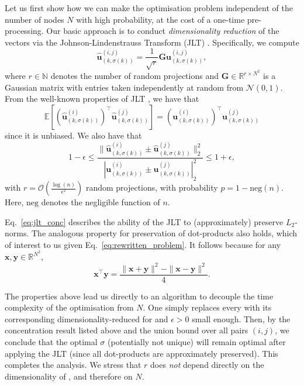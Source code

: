 Let us first show how we can make the optimisation problem independent of the number of nodes $N$ with high probability, at the cost of \vspace{0.25mm}a one-time pre-processing.
Our basic approach is to conduct \emph{dimensionality reduction} of the vectors  via the Johnson-Lindenstrauss Transform (JLT) \citep{jlt}.
Specifically, we compute
\begin{equation}
\widehat{\mathbf{u}}^{(i,j)}_{(k,\sigma(k))} = \frac{1}{\sqrt{r}}\mathbf{G}\mathbf{u}^{(i,j)}_{(k,\sigma(k))},  
\end{equation}
where $r \in \mathbb{N}$ denotes the number of random projections and 
$\mathbf{G} \in \mathbb{R}^{r \times N^{2}}$ is a Gaussian matrix with entries taken independently at random from $\mathcal{N}(0, 1)$.
From the well-known properties of JLT \citep{dasgupta_jlt}, we have that
\begin{equation}
\mathbb{E}[(\widehat{\mathbf{u}}^{(i)}_{(k,\sigma(k))})^{\top}\widehat{\mathbf{u}}^{(j)}_{(k,\sigma(k))}] = 
(\mathbf{u}^{(i)}_{(k,\sigma(k))})^{\top}\mathbf{u}^{(j)}_{(k,\sigma(k))} 
\end{equation}
since it is unbiased. 
We also have that
\begin{equation} \label{eq:jlt_conc}
    1-\epsilon \leq \frac{\|\widehat{\mathbf{u}}^{(i)}_{(k,\sigma(k))} \pm \widehat{\mathbf{u}}^{(j)}_{(k,\sigma(k))}\|^{2}_{2}}
{|\mathbf{u}^{(i)}_{(k,\sigma(k))} \pm \mathbf{u}^{(j)}_{(k,\sigma(k))}|^{2}_{2}} \leq 1+\epsilon,
\end{equation}
with $r=\mathcal{O}(\frac{\log(n)}{\epsilon^{2}})$ random projections, with probability $p  = 1 - \textrm{neg}(n)$.
Here, $\textrm{neg}$ denotes the negligible function of $n$.

Eq.~\ref{eq:jlt_conc} describes the ability of the JLT to (approximately) preserve $L_2$-norms.
The analogous property for preservation of dot-products also holds, which of interest to us given Eq.~\ref{eq:rewritten_problem}. 
It follows because for any $\mathbf{x},\mathbf{y}\in \mathbb{R}^{N^{2}}$,
\begin{equation}
\mathbf{x}^{\top}\mathbf{y} = \frac{\|\mathbf{x}+\mathbf{y}\|^{2}-\|\mathbf{x}-\mathbf{y}\|^{2}}{4}.
\end{equation}

The properties above lead us directly to an algorithm to decouple the time complexity of the optimisation from $N$.
One simply replaces every  with its corresponding dimensionality-reduced 
for  and $\epsilon>0$ small enough. 
Then, by the concentration result listed above and the union bound over all pairs $(i, j)$, we conclude that the optimal 
$\sigma$ (potentially not unique) will remain optimal after applying the JLT (since all dot-products are approximately preserved). 
This completes the analysis.
We stress that $r$ does \emph{not} depend directly on the dimensionality of  , and therefore on $N$.

